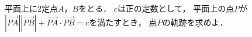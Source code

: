 \documentclass[../../main.tex]{subfiles}
\begin{document}
平面上に2定点$A$，$B$をとる．
$c$は正の定数として，
平面上の点$P$が$|\overrightarrow{PA}||\overrightarrow{PB}|+\overrightarrow{PA}\cdot\overrightarrow{PB}=c$を満たすとき，
点$P$の軌跡を求めよ．
\end{document}
